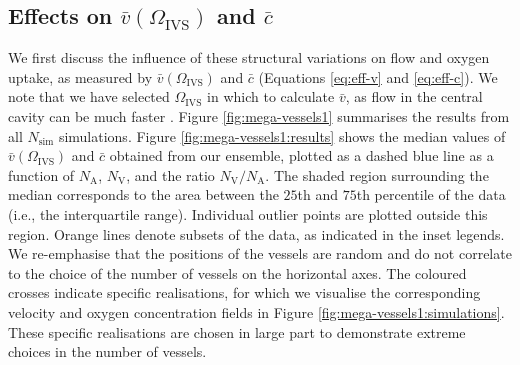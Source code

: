        \subsection{Effects on \texorpdfstring{$\bar{v}(\Omega_\text{IVS})$}{average IVS speed} and \texorpdfstring{$\bar{c}$}{average oxygen concentration}} \label{sec:nutrient-uptake:average-velocity-and-concentration}
            We first discuss the influence of these structural variations on flow and oxygen uptake, as measured by $\bar{v}(\Omega_\text{IVS})$ and $\bar{c}$ (Equations \eqref{eq:eff-v} and \eqref{eq:eff-c}). We note that we have selected $\Omega_\text{IVS}$ in which to calculate $\bar{v}$, as flow in the central cavity can be much faster \cite{lecarpentierComputationalFluidDynamic2016}. Figure \ref{fig:mega-vessels1} summarises the results from all $N_\text{sim}$ simulations. Figure \ref{fig:mega-vessels1:results} shows the median values of $\bar{v}(\Omega_\text{IVS})$ and $\bar{c}$ obtained from our ensemble, plotted as a dashed blue line as a function of $N_\text{A}$, $N_\text{V}$, and the ratio $N_\text{V}/N_\text{A}$. The shaded region surrounding the median corresponds to the area between the $25$th and $75$th percentile of the data (i.e., the interquartile range). Individual outlier points are plotted outside this region. Orange lines denote subsets of the data, as indicated in the inset legends. We re-emphasise that the positions of the vessels are random and do not correlate to the choice of the number of vessels on the horizontal axes. The coloured crosses indicate specific realisations, for which we visualise the corresponding velocity and oxygen concentration fields in Figure \ref{fig:mega-vessels1:simulations}. These specific realisations are chosen in large part to demonstrate extreme choices in the number of vessels.

